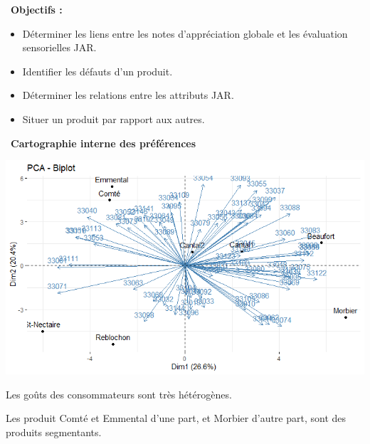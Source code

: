 \documentclass[aspectratio=169,xcolor=dvipsnames]{beamer}
\begin{document}
\begin{frame}
	
	\vfill

\textcolor{nyubluedarker}{\faBullseye \ \textbf{Objectifs :}}
		
	\medskip		
		
	\begin{itemize}
	\item[\faCogs] Déterminer les liens entre les notes d'appréciation globale et les évaluation sensorielles JAR.
	\item[\faCogs] Identifier les défauts d'un produit.
	\item[\faCogs] Déterminer les relations entre les attributs JAR.
	\item[\faCogs] Situer un produit par rapport aux autres.
	\end{itemize}
	
	\vfill	
	
\end{frame}

\begin{frame}
\textcolor{nyubluedarker}{\faChartBar \ \textbf{Cartographie interne des préférences}}

\begin{center}
\includegraphics[scale=0.5]{cart_interne.png}
\end{center}

\textcolor{nyubluedarker}{\faLightbulb[regular]} Les goûts des consommateurs sont très hétérogènes.

\medskip

\textcolor{nyubluedarker}{\faLightbulb[regular]} Les produit \og Comté \fg{} et \og Emmental \fg{} d'une part, et \og Morbier \fg{} d'autre part, sont des produits segmentants.  

\end{frame}
\end{document}
